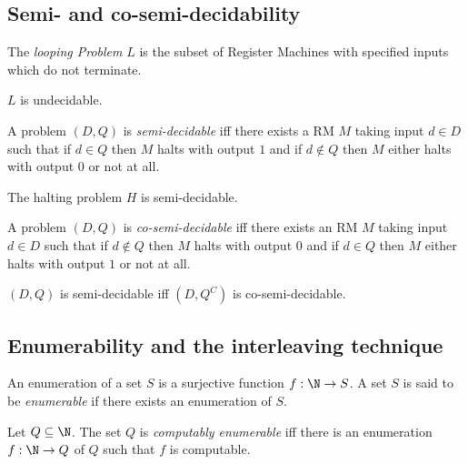 \documentclass{article}
\begin{document}
\subsection{Semi- and co-semi-decidability}

\begin{definition*}[Looping]
	The \emph{looping Problem} $L$ is the subset of Register Machines with specified
	inputs which do not terminate.
\end{definition*}

\begin{theorem*}
	$L$ is undecidable.
\end{theorem*}

\begin{definition*}
	A problem $(D,Q)$ is \emph{semi-decidable} iff there exists a RM $M$ taking
	input $d\in D$ such that if $d\in Q$ then $M$ halts with output $1$ and if
	$d\not\in Q$ then $M$ either halts with output $0$ or not at all.
\end{definition*}

\begin{corollary*}
	The halting problem $H$ is semi-decidable.
\end{corollary*}

\begin{definition*}
	A problem $(D,Q)$ is \emph{co-semi-decidable} iff there exists an RM $M$
	taking input $d\in D$ such that if $d\not\in Q$ then $M$ halts with output
	$0$ and if $d\in Q$ then $M$ either halts with output $1$ or not at all.
\end{definition*}

\begin{theorem*}
	$(D,Q)$ is semi-decidable iff $(D, Q^C)$ is co-semi-decidable.
\end{theorem*}

\subsection{Enumerability and the interleaving technique}

\begin{definition*}[Enumerability]
	An enumeration of a set $S$ is a surjective function $f:\N\to S$. A set $S$
	is said to be \emph{enumerable} if there exists an enumeration of $S$.
\end{definition*}

\begin{definition*}
	Let $Q\subseteq\N$. The set $Q$ is \emph{computably enumerable} iff there is
	an enumeration $f:\N\to Q$ of $Q$ such that $f$ is computable.
\end{definition*}
\end{document}
